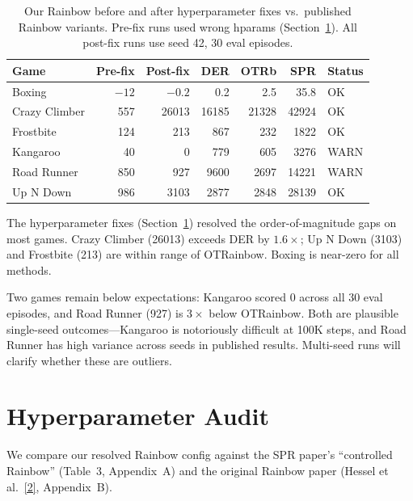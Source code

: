 \documentclass[11pt]{article}
\newcommand{\citelink}[2]{\href{#1}{\small[#2]}}
\newcommand{\ok}{\textcolor{green!60!black}{OK}}
\newcommand{\warn}{\textcolor{orange!80!black}{WARN}}
\begin{document}
\begin{table}[H]
\centering
\small
\renewcommand{\arraystretch}{1.5}
\setlength{\tabcolsep}{6pt}
\begin{tabular}{l rrrrrl}
\toprule
\textbf{Game} & \textbf{Pre-fix} & \textbf{Post-fix}
  & \textbf{DER} & \textbf{OTRb} & \textbf{SPR}
  & \textbf{Status} \\
\midrule
Boxing        & $-12$ & $-0.2$  & 0.2   & 2.5   & 35.8  & \ok \\
Crazy Climber & 557   & 26013   & 16185 & 21328 & 42924 & \ok \\
Frostbite     & 124   & 213     & 867   & 232   & 1822  & \ok \\
Kangaroo      & 40    & 0       & 779   & 605   & 3276  & \warn \\
Road Runner   & 850   & 927     & 9600  & 2697  & 14221 & \warn \\
Up N Down     & 986   & 3103    & 2877  & 2848  & 28139 & \ok \\
\bottomrule
\end{tabular}
\caption{Our Rainbow before and after hyperparameter fixes vs.\
published Rainbow variants. Pre-fix runs used wrong hparams
(Section~\ref{sec:audit}). All post-fix runs use seed 42, 30 eval
episodes.}
\label{tab:rainbow-gap}
\end{table}

The hyperparameter fixes (Section~\ref{sec:audit}) resolved the
order-of-magnitude gaps on most games. Crazy Climber (26013) exceeds
DER by $1.6\times$; Up N Down (3103) and Frostbite (213) are within
range of OTRainbow. Boxing is near-zero for all methods.

Two games remain below expectations: Kangaroo scored 0 across all 30
eval episodes, and Road Runner (927) is $3\times$ below OTRainbow.
Both are plausible single-seed outcomes---Kangaroo is notoriously
difficult at 100K steps, and Road Runner has high variance across
seeds in published results. Multi-seed runs will clarify whether
these are outliers.

\section{Hyperparameter Audit}
\label{sec:audit}

We compare our resolved Rainbow config against the SPR paper's
``controlled Rainbow'' (Table~3, Appendix~A) and the original Rainbow
paper (Hessel et al.\ \citelink{https://arxiv.org/abs/1710.02298}{2},
Appendix~B).
\end{document}
